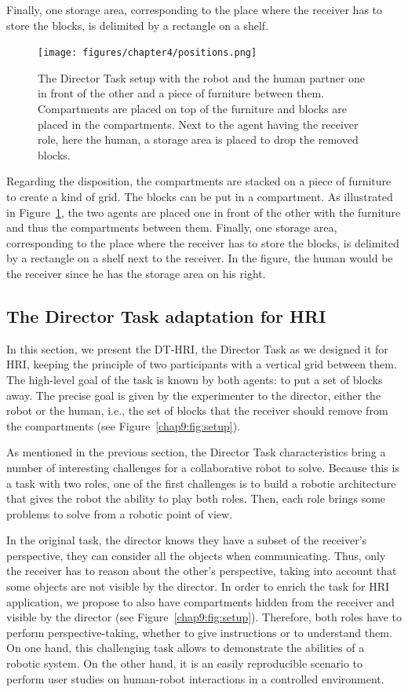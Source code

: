 \documentclass[a4paper,11pt,twoside]{StyleThese}
\begin{document}
Finally, one storage area, corresponding to the place where the receiver has to store the blocks, is delimited by a rectangle on a shelf.

\begin{figure}[ht!]
	\centering
	\texttt{[image: figures/chapter4/positions.png]}
	\caption{\label{chap9:fig:positions} The Director Task setup with the robot and the human partner one in front of the other and a piece of furniture between them. Compartments are placed on top of the furniture and blocks are placed in the compartments. Next to the agent having the receiver role, here the human, a storage area is placed to drop the removed blocks. }
\end{figure}

Regarding the disposition, the compartments are stacked on a piece of furniture to create a kind of grid. The blocks can be put in a compartment. As illustrated in Figure~\ref{chap9:fig:positions}, the two agents are placed one in front of the other with the furniture and thus the compartments between them. Finally, one storage area, corresponding to the place where the receiver has to store the blocks, is delimited by a rectangle on a shelf next to the receiver. In the figure, the human would be the receiver since he has the storage area on his right.

\subsection{The Director Task adaptation for HRI}

In this section, we present the DT-HRI, the Director Task as we designed it for HRI, keeping the principle of two participants with a vertical grid between them. The high-level goal of the task is known by both agents: to put a set of blocks away. The precise goal is given by the experimenter to the director, either the robot or the human, i.e., the set of blocks that the receiver should remove from the compartments (see Figure~\ref{chap9:fig:setup}).

As mentioned in the previous section, the Director Task characteristics bring a number of interesting  challenges for a collaborative robot to solve. Because this is a task with two roles, one of the first challenges is to build a robotic architecture that gives the robot the ability to play both roles. Then, each role brings some problems to solve from a robotic point of view. 

In the original task, the director knows they have a subset of the receiver's perspective, they can consider all the objects when communicating. Thus, only the receiver has to reason about the other's perspective, taking into account that some objects are not visible by the director. In order to enrich the task for HRI application, we propose to also have compartments hidden from the receiver and visible by the director (see Figure~\ref{chap9:fig:setup}). Therefore, both roles have to perform perspective-taking, whether to give instructions or to understand them.
On one hand, this challenging task allows to demonstrate the abilities of a robotic system. On the other hand, it is an easily reproducible scenario to perform user studies on human-robot interactions in a controlled environment. 
\end{document}
